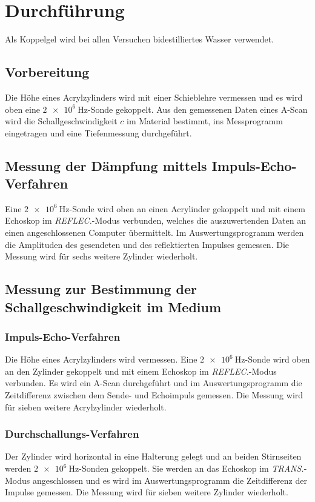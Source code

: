 \section{Durchführung}
\label{sec:Durchführung}

Als Koppelgel wird bei allen Versuchen bidestilliertes Wasser verwendet.

\subsection{Vorbereitung}
Die Höhe eines Acrylzylinders wird mit einer Schieblehre vermessen und es wird oben eine $\SI{2e6}{\hertz}$-Sonde gekoppelt.
Aus den gemessenen Daten eines A-Scan wird die Schallgeschwindigkeit $c$ im Material bestimmt, ins Messprogramm eingetragen und eine Tiefenmessung durchgeführt.

\subsection{Messung der Dämpfung mittels Impuls-Echo-Verfahren}
Eine $\SI{2e6}{\hertz}$-Sonde wird oben an einen Acrylinder gekoppelt und mit einem Echoskop im \textit{REFLEC.}-Modus verbunden, welches die auszuwertenden Daten an einen angeschlossenen Computer übermittelt.
Im Auswertungsprogramm werden die Amplituden des gesendeten und des reflektierten Impulses gemessen. 
Die Messung wird für sechs weitere Zylinder wiederholt.

\subsection{Messung zur Bestimmung der Schallgeschwindigkeit im Medium}
\subsubsection{Impuls-Echo-Verfahren}
Die Höhe eines Acrylzylinders wird vermessen. Eine $\SI{2e6}{\hertz}$-Sonde wird oben an den Zylinder gekoppelt und mit einem Echoskop im \textit{REFLEC.}-Modus verbunden.
Es wird ein A-Scan durchgeführt und im Auswertungsprogramm die Zeitdifferenz zwischen dem Sende- und Echoimpuls gemessen.
Die Messung wird für sieben weitere Acrylzylinder wiederholt.

\subsubsection{Durchschallungs-Verfahren}
Der Zylinder wird horizontal in eine Halterung gelegt und an beiden Stirnseiten werden $\SI{2e6}{\hertz}$-Sonden gekoppelt. Sie werden an das Echoskop im \textit{TRANS.}-Modus angeschlossen und es wird im Auswertungsprogramm die Zeitdifferenz der Impulse gemessen.
Die Messung wird für sieben weitere Zylinder wiederholt.

